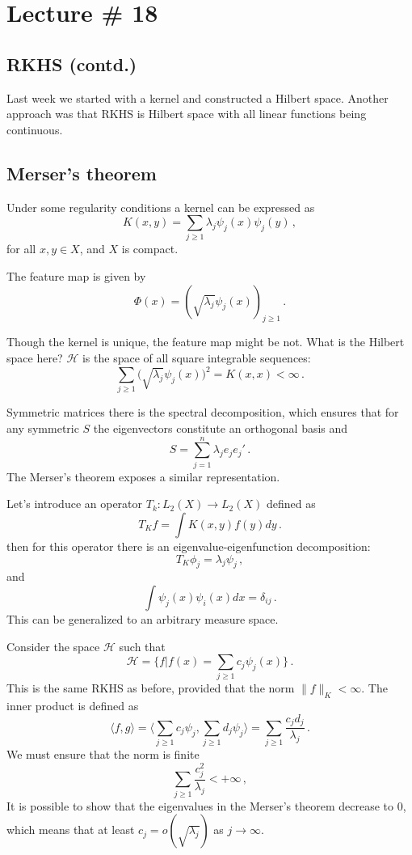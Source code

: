 \documentclass[a4paper]{article}
\newcommand{\Hcal}{\mathcal{H}}
\begin{document}


\section{Lecture \# 18} %
\label{sec:lecture_18}

\subsection{RKHS (contd.)} %
\label{sub:rkhs_contd}
Last week we started with a kernel and constructed a Hilbert space. Another approach
was that RKHS is Hilbert space with all linear functions being continuous.


\subsection{Merser's theorem} %
\label{sub:merser_s_theorem}
Under some regularity conditions a kernel can be expressed as
\[ K(x,y) = \sum_{j\geq1} \lambda_j \psi_j(x) \psi_j(y)\,, \]
for all $x,y\in X$, and $X$ is compact.

The feature map is given by
\[ \Phi(x) = (\sqrt{\lambda_j} \psi_j(x))_{j\geq 1}\,. \]

Though the kernel is unique, the feature map might be not. What is the Hilbert space
here? $\Hcal$ is the space of all square integrable sequences:
\[
\sum_{j\geq1} \bigr(\sqrt{\lambda_j} \psi_j(x)\bigr)^2 = K(x,x) < \infty\,.
\]

Symmetric matrices there is the spectral decomposition, which ensures that
for any symmetric $S$ the eigenvectors constitute an orthogonal basis and
\[ S = \sum_{j=1}^n \lambda_j e_je_j' \,. \]
The Merser's theorem exposes a similar representation.

Let's introduce an operator $T_k : L_2(X) \to L_2(X) $ defined as 
\[ T_K f = \int K(x,y) f(y) dy \,. \]
then for this operator there is an eigenvalue-eigenfunction decomposition:
\[  T_K \phi_j = \lambda_j \psi_j\,, \]
and 
\[ \int \psi_j(x)\psi_i(x) dx = \delta_{ij}\,. \]
This can be generalized to an arbitrary measure space.

Consider the space $\Hcal$ such that
\[ \Hcal = \{ f \big| f(x) = \sum_{j\geq1} c_j \psi_j(x) \}\,. \]
This is the same RKHS as before, provided that the norm $\|f\|_K<\infty$.
The inner product is defined as
\[
\langle f,g\rangle
= \bigl\langle \sum_{j\geq1}c_j \psi_j, \sum_{j\geq1} d_j \psi_j \bigr\rangle
= \sum_{j\geq1} \frac{c_j d_j}{\lambda_j}\,.
\]
We must ensure that the norm is finite
\[ \sum_{j\geq1} \frac{c_j^2}{\lambda_j} < +\infty\,, \]
It is possible to show that the eigenvalues in the Merser's theorem decrease to $0$,
which means that at least $c_j = o(\sqrt{\lambda_j})$ as $j\to \infty$.
\end{document}
